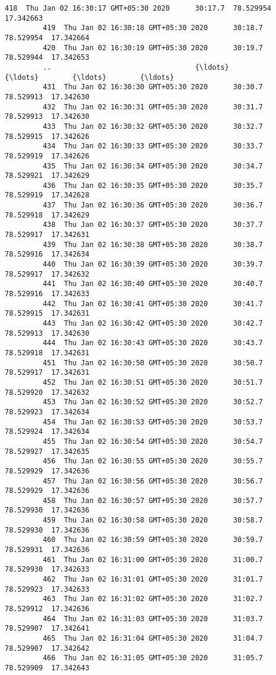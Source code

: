 \documentclass[11pt]{article}
\begin{document}
\begin{Verbatim}[commandchars=\\\{\}]
         418  Thu Jan 02 16:30:17 GMT+05:30 2020      30:17.7  78.529954  17.342663   
         419  Thu Jan 02 16:30:18 GMT+05:30 2020      30:18.7  78.529954  17.342664   
         420  Thu Jan 02 16:30:19 GMT+05:30 2020      30:19.7  78.529944  17.342653   
         ..                                  {\ldots}          {\ldots}        {\ldots}        {\ldots}   
         431  Thu Jan 02 16:30:30 GMT+05:30 2020      30:30.7  78.529913  17.342630   
         432  Thu Jan 02 16:30:31 GMT+05:30 2020      30:31.7  78.529913  17.342630   
         433  Thu Jan 02 16:30:32 GMT+05:30 2020      30:32.7  78.529915  17.342626   
         434  Thu Jan 02 16:30:33 GMT+05:30 2020      30:33.7  78.529919  17.342626   
         435  Thu Jan 02 16:30:34 GMT+05:30 2020      30:34.7  78.529921  17.342629   
         436  Thu Jan 02 16:30:35 GMT+05:30 2020      30:35.7  78.529919  17.342628   
         437  Thu Jan 02 16:30:36 GMT+05:30 2020      30:36.7  78.529918  17.342629   
         438  Thu Jan 02 16:30:37 GMT+05:30 2020      30:37.7  78.529917  17.342631   
         439  Thu Jan 02 16:30:38 GMT+05:30 2020      30:38.7  78.529916  17.342634   
         440  Thu Jan 02 16:30:39 GMT+05:30 2020      30:39.7  78.529917  17.342632   
         441  Thu Jan 02 16:30:40 GMT+05:30 2020      30:40.7  78.529916  17.342633   
         442  Thu Jan 02 16:30:41 GMT+05:30 2020      30:41.7  78.529915  17.342631   
         443  Thu Jan 02 16:30:42 GMT+05:30 2020      30:42.7  78.529913  17.342630   
         444  Thu Jan 02 16:30:43 GMT+05:30 2020      30:43.7  78.529918  17.342631   
         451  Thu Jan 02 16:30:50 GMT+05:30 2020      30:50.7  78.529917  17.342631   
         452  Thu Jan 02 16:30:51 GMT+05:30 2020      30:51.7  78.529920  17.342632   
         453  Thu Jan 02 16:30:52 GMT+05:30 2020      30:52.7  78.529923  17.342634   
         454  Thu Jan 02 16:30:53 GMT+05:30 2020      30:53.7  78.529924  17.342634   
         455  Thu Jan 02 16:30:54 GMT+05:30 2020      30:54.7  78.529927  17.342635   
         456  Thu Jan 02 16:30:55 GMT+05:30 2020      30:55.7  78.529929  17.342636   
         457  Thu Jan 02 16:30:56 GMT+05:30 2020      30:56.7  78.529929  17.342636   
         458  Thu Jan 02 16:30:57 GMT+05:30 2020      30:57.7  78.529930  17.342636   
         459  Thu Jan 02 16:30:58 GMT+05:30 2020      30:58.7  78.529930  17.342636   
         460  Thu Jan 02 16:30:59 GMT+05:30 2020      30:59.7  78.529931  17.342636   
         461  Thu Jan 02 16:31:00 GMT+05:30 2020      31:00.7  78.529930  17.342633   
         462  Thu Jan 02 16:31:01 GMT+05:30 2020      31:01.7  78.529923  17.342633   
         463  Thu Jan 02 16:31:02 GMT+05:30 2020      31:02.7  78.529912  17.342636   
         464  Thu Jan 02 16:31:03 GMT+05:30 2020      31:03.7  78.529907  17.342641   
         465  Thu Jan 02 16:31:04 GMT+05:30 2020      31:04.7  78.529907  17.342642   
         466  Thu Jan 02 16:31:05 GMT+05:30 2020      31:05.7  78.529909  17.342643   
         

\end{Verbatim}
\end{document}
